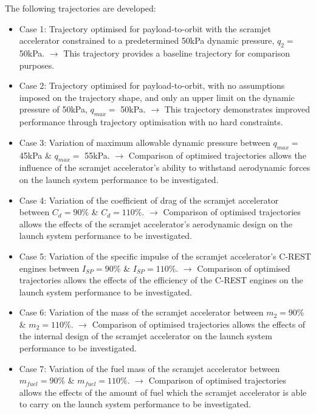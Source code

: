 The following trajectories are developed: 
\begin{itemize}
	\item Case 1: Trajectory optimised for payload-to-orbit with the scramjet accelerator constrained to a predetermined 50kPa dynamic pressure, $q_2 = $ 50kPa. \newline$\rightarrow$ This trajectory provides a baseline trajectory for comparison purposes.
	\item Case 2: Trajectory optimised for payload-to-orbit, with no assumptions imposed on the trajectory shape, and only an upper limit on the dynamic pressure of 50kPa, $q_{max} = $ 50kPa. \newline$\rightarrow$ This trajectory demonstrates improved performance through trajectory optimisation with no hard constraints.
	\item Case 3: Variation of maximum allowable dynamic pressure between $q_{max} = $ 45kPa \& $q_{max} = $ 55kPa. 
	\newline$\rightarrow$ Comparison of optimised trajectories allows the influence of the scramjet accelerator's ability to withstand aerodynamic forces on the launch system performance to be investigated.
	\item Case 4: Variation of the coefficient of drag of the scramjet accelerator between $C_d = 90\%$ \& $C_d = 110\%$. 
	\newline$\rightarrow$ Comparison of optimised trajectories allows the effects of the scramjet accelerator's aerodynamic design on the launch system performance to be investigated.
	\item Case 5: Variation of the specific impulse of the scramjet accelerator's C-REST engines between $I_{SP} = 90\%$ \& $I_{SP} = 110\%$. 
	\newline$\rightarrow$ Comparison of optimised trajectories allows the effects of the efficiency of the C-REST engines on the launch system performance to be investigated. 
	\item Case 6: Variation of the mass of the scramjet accelerator between $m_2 = 90\%$ \& $m_2 = 110\%$. 
	\newline$\rightarrow$ Comparison of optimised trajectories allows the effects of the internal design of the scramjet accelerator on the launch system performance to be investigated. 
	\item Case 7: Variation of the fuel mass of the scramjet accelerator between $m_{fuel} = 90\%$ \& $m_{fuel} = 110\%$. 
	\newline$\rightarrow$ Comparison of optimised trajectories allows the effects of the amount of fuel which the scramjet accelerator is able to carry on the launch system performance to be investigated. 

\end{itemize}
